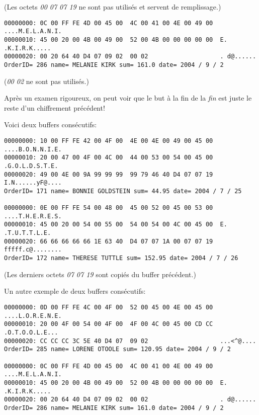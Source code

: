 (Les octets \emph{00 07 07 19} ne sont pas utilisés et servent de remplissage.)

\begin{lstlisting}
00000000: 0C 00 FF FE 4D 00 45 00  4C 00 41 00 4E 00 49 00  ....M.E.L.A.N.I.
00000010: 45 00 20 00 4B 00 49 00  52 00 4B 00 00 00 00 00  E. .K.I.R.K.....
00000020: 00 20 64 40 D4 07 09 02  00 02                    . d@......
OrderID= 286 name= MELANIE KIRK sum= 161.0 date= 2004 / 9 / 2
\end{lstlisting}

(\emph{00 02} ne sont pas utilisés.)

Après un examen rigoureux, on peut voir que le but à la fin de la \emph{fin} est
juste le reste d'un chiffrement précédent!

Voici deux buffers consécutifs:

\begin{lstlisting}
00000000: 10 00 FF FE 42 00 4F 00  4E 00 4E 00 49 00 45 00  ....B.O.N.N.I.E.
00000010: 20 00 47 00 4F 00 4C 00  44 00 53 00 54 00 45 00   .G.O.L.D.S.T.E.
00000020: 49 00 4E 00 9A 99 99 99  99 79 46 40 D4 07 07 19  I.N......yF@....
OrderID= 171 name= BONNIE GOLDSTEIN sum= 44.95 date= 2004 / 7 / 25

00000000: 0E 00 FF FE 54 00 48 00  45 00 52 00 45 00 53 00  ....T.H.E.R.E.S.
00000010: 45 00 20 00 54 00 55 00  54 00 54 00 4C 00 45 00  E. .T.U.T.T.L.E.
00000020: 66 66 66 66 66 1E 63 40  D4 07 07 1A 00 07 07 19  fffff.c@........
OrderID= 172 name= THERESE TUTTLE sum= 152.95 date= 2004 / 7 / 26
\end{lstlisting}

(Les derniers octets \emph{07 07 19} sont copiés du buffer précédent.) 

Un autre exemple de deux buffers consécutifs:

\begin{lstlisting}
00000000: 0D 00 FF FE 4C 00 4F 00  52 00 45 00 4E 00 45 00  ....L.O.R.E.N.E.
00000010: 20 00 4F 00 54 00 4F 00  4F 00 4C 00 45 00 CD CC   .O.T.O.O.L.E...
00000020: CC CC CC 3C 5E 40 D4 07  09 02                    ...<^@....
OrderID= 285 name= LORENE OTOOLE sum= 120.95 date= 2004 / 9 / 2

00000000: 0C 00 FF FE 4D 00 45 00  4C 00 41 00 4E 00 49 00  ....M.E.L.A.N.I.
00000010: 45 00 20 00 4B 00 49 00  52 00 4B 00 00 00 00 00  E. .K.I.R.K.....
00000020: 00 20 64 40 D4 07 09 02  00 02                    . d@......
OrderID= 286 name= MELANIE KIRK sum= 161.0 date= 2004 / 9 / 2
\end{lstlisting}

